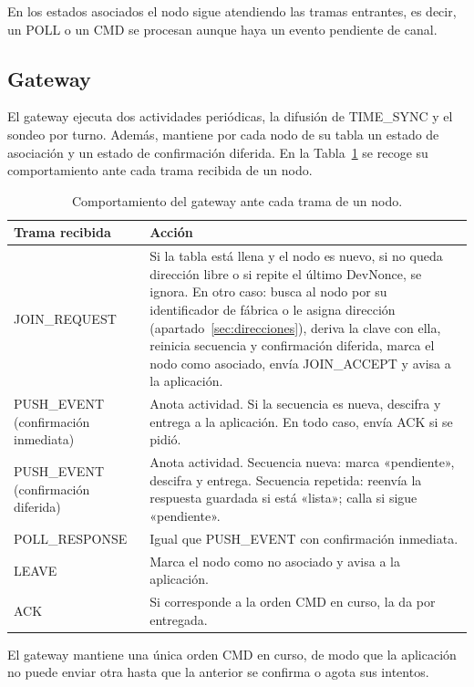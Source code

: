 En los estados asociados el nodo sigue atendiendo las tramas entrantes, es decir, un POLL o un CMD se procesan aunque haya un evento pendiente de canal.

\subsection{Gateway}

El gateway ejecuta dos actividades periódicas, la difusión de TIME\_SYNC y el sondeo por turno. Además, mantiene por cada nodo de su tabla un estado de asociación y un estado de confirmación diferida. En la Tabla~\ref{tab:fsm-gw} se recoge su comportamiento ante cada trama recibida de un nodo.

\begin{table}[H]
\centering
\caption{\label{tab:fsm-gw} Comportamiento del gateway ante cada trama de un nodo.}
\begin{tabular}{|p{3.2cm}|p{10.6cm}|}
\hline
\textbf{Trama recibida} & \textbf{Acción} \\
\hline
JOIN\_REQUEST & Si la tabla está llena y el nodo es nuevo, si no queda dirección libre o si repite el último DevNonce, se ignora. En otro caso: busca al nodo por su identificador de fábrica o le asigna dirección (apartado~\ref{sec:direcciones}), deriva la clave con ella, reinicia secuencia y confirmación diferida, marca el nodo como asociado, envía JOIN\_ACCEPT y avisa a la aplicación. \\
\hline
PUSH\_EVENT (confirmación inmediata) & Anota actividad. Si la secuencia es nueva, descifra y entrega a la aplicación. En todo caso, envía ACK si se pidió. \\
\hline
PUSH\_EVENT (confirmación diferida) & Anota actividad. Secuencia nueva: marca «pendiente», descifra y entrega. Secuencia repetida: reenvía la respuesta guardada si está «lista»; calla si sigue «pendiente». \\
\hline
POLL\_RESPONSE & Igual que PUSH\_EVENT con confirmación inmediata. \\
\hline
LEAVE & Marca el nodo como no asociado y avisa a la aplicación. \\
\hline
ACK & Si corresponde a la orden CMD en curso, la da por entregada. \\
\hline
\end{tabular}
\end{table}

El gateway mantiene una única orden CMD en curso, de modo que la aplicación no puede enviar otra hasta que la anterior se confirma o agota sus intentos.

